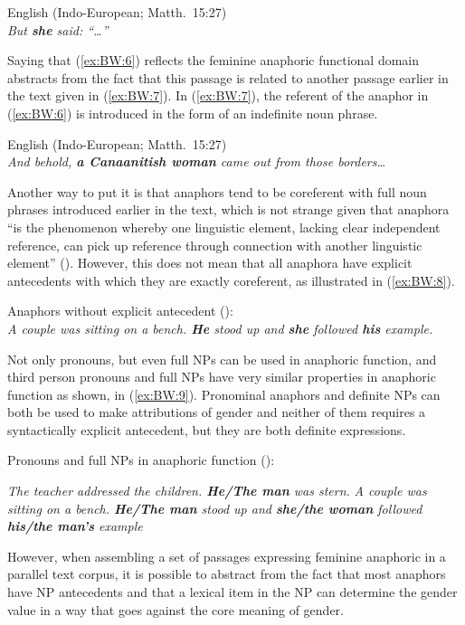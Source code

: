 \documentclass[output=collectionpaper]{langsci/langscibook}
\begin{document}
\ea\label{ex:BW:6}
English (Indo-European; Matth.~15:27)\\
\textit{But \textbf{she} said: ``\ldots''}
\z

Saying that (\ref{ex:BW:6}) reflects the feminine anaphoric functional domain abstracts from the fact that this passage is related to another passage earlier in the text given in (\ref{ex:BW:7}). In (\ref{ex:BW:7}), the referent of the anaphor in (\ref{ex:BW:6}) is introduced in the form of an indefinite noun phrase.

\ea\label{ex:BW:7}
English (Indo-European; Matth.~15:27)\\
\textit{And behold, \textbf{a Canaanitish woman} came out from those borders\ldots}
\z

Another way to put it is that anaphors tend to be coreferent with full noun phrases introduced earlier in the text, which is not strange given that anaphora “is the phenomenon whereby one linguistic element, lacking clear independent reference, can pick up reference through connection with another linguistic element” (\citealt[379]{Levinson1987}). However, this does not mean that all anaphora have explicit antecedents with which they are exactly coreferent, as illustrated in (\ref{ex:BW:8}).

\ea\label{ex:BW:8}
Anaphors without explicit antecedent (\citealt[98]{Hintikka1985}):\\
\textit{A couple was sitting on a bench. \textbf{He} stood up and \textbf{she} followed \textbf{his} example.}
\z

Not only pronouns, but even full NPs can be used in anaphoric function, and third person pronouns and full NPs have very similar properties in anaphoric function as shown, in (\ref{ex:BW:9}). Pronominal anaphors and definite NPs can both be used to make attributions of gender and neither of them requires a syntactically explicit antecedent, but they are both definite expressions.

\ea\label{ex:BW:9}
Pronouns and full NPs in anaphoric function (\citealt[98]{Hintikka1985}):\\
\begin{xlist}
\ex
\textit{The teacher addressed the children. \textbf{He/The man} was stern.}
\ex
\textit{A couple was sitting on a bench. \textbf{He/The man} stood up and \textbf{she/the woman} followed \textbf{his/the man’s} example}
\end{xlist}
\z

However, when assembling a set of passages expressing feminine anaphoric in a parallel text corpus, it is possible to abstract from the fact that most anaphors have NP antecedents and that a lexical item in the NP can determine the gender value in a way that goes against the core meaning of gender.
\end{document}
